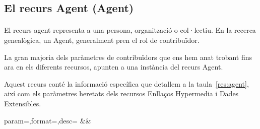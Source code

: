 \subsection{El recurs Agent (Agent)}

    \paragraph{}
    El recurs agent representa a una persona, organització o col·lectiu. En la recerca genealògica, un Agent, generalment pren el rol de contribuïdor.

    La gran majoria dels paràmetres de contribuïdors que ens hem anat trobant fins ara en els diferents recursos, apunten a una instància del recurs Agent.

    Aquest recurs conté la informació específica que detallem a la taula~\ref{res:agent}, així com els paràmetres heretats dels recursos Enllaços Hypermedia i Dades Extensibles.

    \begin{center}
             {param=\param,format=\format,desc=\desc}
             {\param&\format&\desc}
     \end{center}
